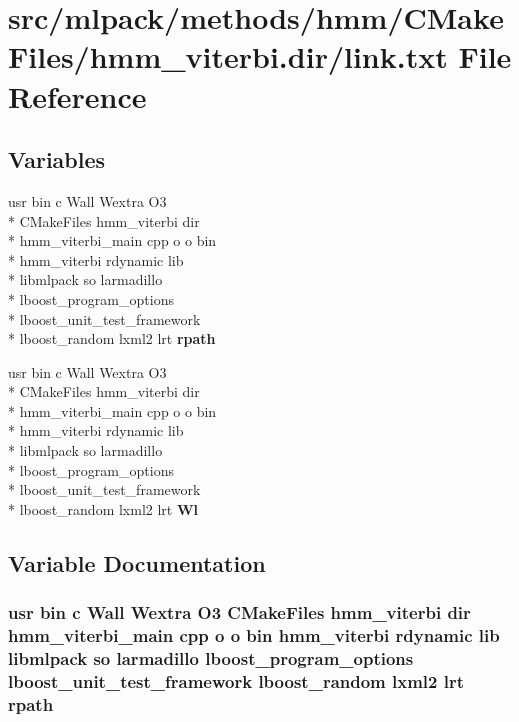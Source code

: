 \section{src/mlpack/methods/hmm/\-C\-Make\-Files/hmm\-\_\-viterbi.dir/link.txt File Reference}
\label{methods_2hmm_2CMakeFiles_2hmm__viterbi_8dir_2link_8txt}
\subsection*{Variables}
\begin{DoxyCompactItemize}
\item 
usr bin c Wall Wextra O3 \\*
C\-Make\-Files hmm\-\_\-viterbi dir \\*
hmm\-\_\-viterbi\-\_\-main cpp o o bin \\*
hmm\-\_\-viterbi rdynamic lib \\*
libmlpack so larmadillo \\*
lboost\-\_\-program\-\_\-options \\*
lboost\-\_\-unit\-\_\-test\-\_\-framework \\*
lboost\-\_\-random lxml2 lrt {\bf rpath}
\item 
usr bin c Wall Wextra O3 \\*
C\-Make\-Files hmm\-\_\-viterbi dir \\*
hmm\-\_\-viterbi\-\_\-main cpp o o bin \\*
hmm\-\_\-viterbi rdynamic lib \\*
libmlpack so larmadillo \\*
lboost\-\_\-program\-\_\-options \\*
lboost\-\_\-unit\-\_\-test\-\_\-framework \\*
lboost\-\_\-random lxml2 lrt {\bf Wl}
\end{DoxyCompactItemize}


\subsection{Variable Documentation}
\subsubsection[{rpath}]{\setlength{\rightskip}{0pt plus 5cm}usr bin c Wall Wextra O3 C\-Make\-Files hmm\-\_\-viterbi dir hmm\-\_\-viterbi\-\_\-main cpp o o bin hmm\-\_\-viterbi rdynamic lib libmlpack so larmadillo lboost\-\_\-program\-\_\-options lboost\-\_\-unit\-\_\-test\-\_\-framework lboost\-\_\-random lxml2 lrt rpath}\label{methods_2hmm_2CMakeFiles_2hmm__viterbi_8dir_2link_8txt_ad5c62e6c5c8814a3ecfa875a6005c3cc}


